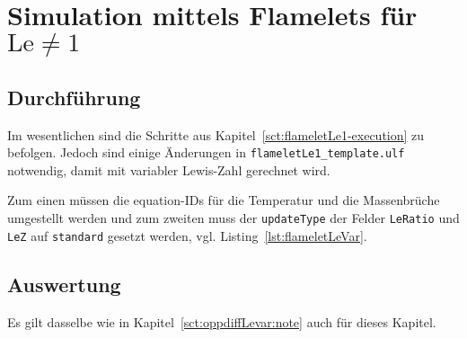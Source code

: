 
\section{Simulation mittels Flamelets für \texorpdfstring{$\mathrm{Le}\neq 1$}{Le!=1}}
\label{sct:flameletLevar}

\subsection{Durchführung}

Im wesentlichen sind die Schritte aus Kapitel~\ref{sct:flameletLe1-execution} zu befolgen. Jedoch sind einige Änderungen in \lstinline!flameletLe1_template.ulf! notwendig, damit mit variabler Lewis-Zahl gerechnet wird.

Zum einen müssen die equation-IDs für die Temperatur und die Massenbrüche umgestellt werden und zum zweiten muss der \texttt{updateType} der Felder \texttt{LeRatio} und \texttt{LeZ} auf \texttt{standard} gesetzt werden, vgl. Listing~\ref{lst:flameletLeVar}.

\subsection{Auswertung}

Es gilt dasselbe wie in Kapitel~\ref{sct:oppdiffLevar:note} auch für dieses Kapitel.

%

